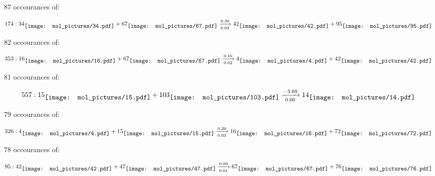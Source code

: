 \documentclass{article}
\begin{document}
\vspace{1cm}


87 occourances of:

$$
174:  
34
\raisebox{-.5\height}{\texttt{[image: mol\_pictures/34.pdf]}}
+
67
\raisebox{-.5\height}{\texttt{[image: mol\_pictures/67.pdf]}}
\xrightarrow[0.03]{0.30}
42
\raisebox{-.5\height}{\texttt{[image: mol\_pictures/42.pdf]}}
+
95
\raisebox{-.5\height}{\texttt{[image: mol\_pictures/95.pdf]}}
$$



\vspace{1cm}


82 occourances of:

$$
353:  
16
\raisebox{-.5\height}{\texttt{[image: mol\_pictures/16.pdf]}}
+
67
\raisebox{-.5\height}{\texttt{[image: mol\_pictures/67.pdf]}}
\xrightarrow[0.02]{0.16}
4
\raisebox{-.5\height}{\texttt{[image: mol\_pictures/4.pdf]}}
+
42
\raisebox{-.5\height}{\texttt{[image: mol\_pictures/42.pdf]}}
$$



\vspace{1cm}


81 occourances of:

$$
557:  
15
\raisebox{-.5\height}{\texttt{[image: mol\_pictures/15.pdf]}}
+
103
\raisebox{-.5\height}{\texttt{[image: mol\_pictures/103.pdf]}}
\xrightarrow[0.00]{-3.69}
14
\raisebox{-.5\height}{\texttt{[image: mol\_pictures/14.pdf]}}
$$



\vspace{1cm}


79 occourances of:

$$
326:  
4
\raisebox{-.5\height}{\texttt{[image: mol\_pictures/4.pdf]}}
+
15
\raisebox{-.5\height}{\texttt{[image: mol\_pictures/15.pdf]}}
\xrightarrow[0.03]{0.26}
16
\raisebox{-.5\height}{\texttt{[image: mol\_pictures/16.pdf]}}
+
72
\raisebox{-.5\height}{\texttt{[image: mol\_pictures/72.pdf]}}
$$



\vspace{1cm}


78 occourances of:

$$
95:  
42
\raisebox{-.5\height}{\texttt{[image: mol\_pictures/42.pdf]}}
+
47
\raisebox{-.5\height}{\texttt{[image: mol\_pictures/47.pdf]}}
\xrightarrow[0.01]{0.09}
67
\raisebox{-.5\height}{\texttt{[image: mol\_pictures/67.pdf]}}
+
76
\raisebox{-.5\height}{\texttt{[image: mol\_pictures/76.pdf]}}
$$
\end{document}
